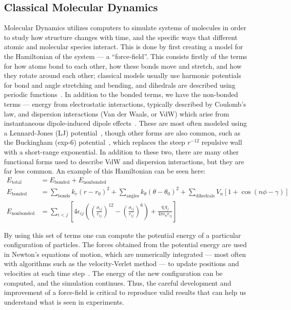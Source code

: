 \subsection{Classical Molecular Dynamics}
Molecular Dynamics utilizes computers to simulate systems of molecules in order to study how structure changes
with time, and the specific ways that different atomic and molecular species interact. This is done
by first creating a model for the Hamiltonian of the system --- a ``force-field''. This consists firstly of the terms for how atoms
bond to each other, how these bonds move and stretch, and how they rotate around each other; classical models
usually use harmonic potentials for bond and angle stretching and bending, and dihedrals 
are described using periodic functions~\cite{gromacsmanual}.
In addition to the bonded terms, we have the non-bonded terms — energy from 
electrostatic interactions, typically described by Coulomb's law, and dispersion 
interactions (Van der Waals, or VdW) which arise from instantaneous dipole-induced dipole effects~\cite{gromacsmanual}. These are 
most often modeled using a Lennard-Jones (LJ) potential~\cite{Jones:1924,gromacsmanual}, though other forms are 
also common, such as the Buckingham (exp-6) potential~\cite{Buckingham:1938,gromacsmanual}, which replaces the steep 
\(r^{-12}\) repulsive wall with a short-range exponential. In addition to these two, there are many other
functional forms used to describe VdW and dispersion interactions, but they are far less common. An example of this Hamiltonian
can be seen here:
\begin{align}
E_{\mathrm{total}} &= E_{\mathrm{bonded}} + E_{\mathrm{nonbonded}} \\
E_{\mathrm{bonded}} &= \sum_{\text{bonds}} k_r (r - r_0)^2
+ \sum_{\text{angles}} k_\theta (\theta - \theta_0)^2
+ \sum_{\text{dihedrals}} V_n \left[ 1 + \cos\left( n\phi - \gamma \right) \right] \\
E_{\mathrm{nonbonded}} &= \sum_{i<j} \left[ 4\epsilon_{ij} \left( \left( \frac{\sigma_{ij}}{r_{ij}} \right)^{12}
- \left( \frac{\sigma_{ij}}{r_{ij}} \right)^{6} \right)
+ \frac{q_i q_j}{4\pi\epsilon_0 r_{ij}} \right]
\end{align}

By using this set of terms one can compute the potential energy of a particular configuration of particles. 
The forces obtained from the potential energy are used in Newton's equations of motion, 
which are numerically integrated — most often with algorithms such as the velocity-Verlet method — 
to update positions and velocities at each time step~\cite{gromacsmanual}.
The energy of the new configuration
can be computed, and the simulation continues. Thus, the careful development and improvement of a force-field is critical to 
reproduce valid results that can help us understand what is seen in experiments.

